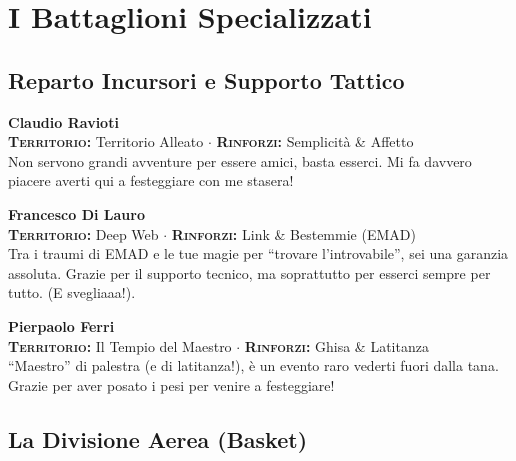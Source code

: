 \section*{I Battaglioni Specializzati}

\subsection*{Reparto Incursori e Supporto Tattico}

\noindent\begin{minipage}{\linewidth}
\textbf{Claudio Ravioti} \\
{\footnotesize \textbf{\textsc{Territorio:}} Territorio Alleato $\cdot$ \textbf{\textsc{Rinforzi:}} Semplicità \& Affetto} \\
Non servono grandi avventure per essere amici, basta esserci. Mi fa davvero piacere averti qui a festeggiare con me stasera!
\end{minipage}
\vspace{0.6cm}

\noindent\begin{minipage}{\linewidth}
\textbf{Francesco Di Lauro} \\
{\footnotesize \textbf{\textsc{Territorio:}} Deep Web $\cdot$ \textbf{\textsc{Rinforzi:}} Link \& Bestemmie (EMAD)} \\
Tra i traumi di EMAD e le tue magie per ``trovare l'introvabile'', sei una garanzia assoluta. Grazie per il supporto tecnico, ma soprattutto per esserci sempre per tutto. (E svegliaaa!).
\end{minipage}
\vspace{0.6cm}

\noindent\begin{minipage}{\linewidth}
\textbf{Pierpaolo Ferri} \\
{\footnotesize \textbf{\textsc{Territorio:}} Il Tempio del Maestro $\cdot$ \textbf{\textsc{Rinforzi:}} Ghisa \& Latitanza} \\
``Maestro'' di palestra (e di latitanza!), è un evento raro vederti fuori dalla tana. Grazie per aver posato i pesi per venire a festeggiare!
\end{minipage}

\subsection*{La Divisione Aerea (Basket)}

